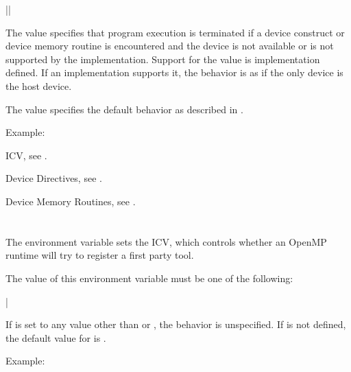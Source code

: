{||}

The  value specifies that program execution is terminated if
a device construct or device memory routine is encountered and the device is
not available or is not supported by the implementation. Support for the
 value is implementation defined.  If an implementation supports
it, the behavior is as if the only device is the host device.

The  value specifies the default behavior as described in
.

Example:
\begin{ompEnv}
\end{ompEnv}

\begin{crossrefs}
\item {} ICV, see .

\item Device Directives, see .

\item Device Memory Routines, see .
\end{crossrefs}



\section{}
\label{sec:OMP_TOOL}

The  environment variable sets the  ICV, which
controls whether an OpenMP runtime will try to register a first party tool.

The value of this environment variable must be one of the following:

{|}

If  is set to any value other than  or
, the behavior is unspecified. If  is not
defined, the default value for  is .

Example:
\begin{ompEnv}
\end{ompEnv}

